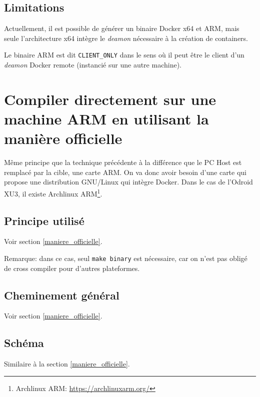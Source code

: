 \documentclass[11pt,a4paper,oneside]{report}
\newcommand{\code}[1]{\texttt{#1}} %
\begin{document}
\subsection{Limitations}\label{maniere_officielle_limitations}

Actuellement, il est possible de générer un binaire Docker x64 et ARM, mais seule l'architecture x64 intègre le \emph{deamon} nécessaire à la création de containers.

Le binaire ARM est dit \code{CLIENT\_ONLY} dans le sens où il peut être le client d'un \emph{deamon} Docker remote (instancié sur une autre machine).


\section{Compiler directement sur une machine ARM en utilisant la manière officielle}

Même principe que la technique précédente à la différence que le PC Host est remplacé par la cible, une carte ARM. On va donc avoir besoin d'une carte qui propose une distribution GNU/Linux qui intègre Docker. Dans le cas de l'Odroid XU3, il existe Archlinux ARM\footnote{Archlinux ARM: \url{https://archlinuxarm.org/}}.

\subsection{Principe utilisé}

Voir section \ref{maniere_officielle}.

Remarque: dans ce cas, seul \code{make binary} est nécessaire, car on n'est pas obligé de cross compiler pour d'autres plateformes.

\subsection{Cheminement général}

Voir section \ref{maniere_officielle}.
\subsection{Schéma}

Similaire à la section \ref{maniere_officielle}.
\end{document}
